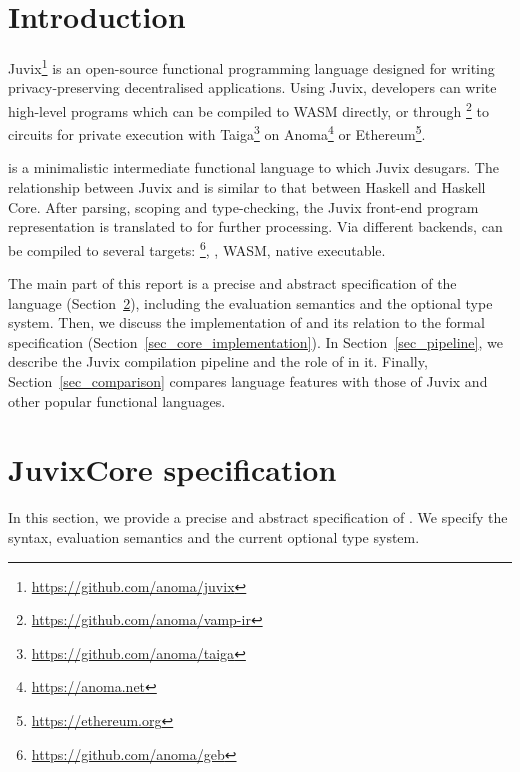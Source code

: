 \documentclass[
    9pt,            %
    techreport,        %
    affiltop,       %
]{art}
\begin{document}
\maketitle
\tableofcontents

\section{Introduction}

Juvix\footnote{\url{https://github.com/anoma/juvix}} is an open-source functional programming language designed for writing privacy-preserving decentralised applications. Using Juvix, developers can write high-level programs which can be compiled to WASM directly, or through \VampIR\footnote{\url{https://github.com/anoma/vamp-ir}} to circuits for private execution with Taiga\footnote{\url{https://github.com/anoma/taiga}} on Anoma\footnote{\url{https://anoma.net}} or Ethereum\footnote{\url{https://ethereum.org}}.

\JuvixCore{} is a minimalistic intermediate functional language to which Juvix desugars. The relationship between Juvix and \JuvixCore{} is similar to that between Haskell and Haskell Core. After parsing, scoping and type-checking, the Juvix front-end program representation is translated to \JuvixCore{} for further processing. Via different backends, \JuvixCore{} can be compiled to several targets: \Geb{}\footnote{\url{https://github.com/anoma/geb}}, \VampIR, WASM, native executable.

The main part of this report is a precise and abstract specification of the \JuvixCore{} language (Section~\ref{sec_specification}), including the evaluation semantics and the optional type system. Then, we discuss the implementation of \JuvixCore{} and its relation to the formal specification
(Section~\ref{sec_core_implementation}). In Section~\ref{sec_pipeline}, we describe the Juvix compilation pipeline and the role of \JuvixCore{} in it. Finally, Section~\ref{sec_comparison} compares \JuvixCore{} language features with those of Juvix and other popular functional languages.

\section{JuvixCore specification}\label{sec_specification}

In this section, we provide a precise and abstract specification of \JuvixCore{}. We specify the syntax, evaluation semantics and the current optional type system.
\end{document}
